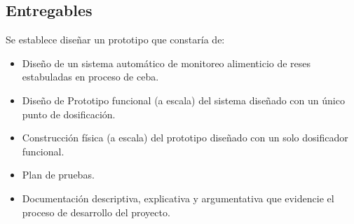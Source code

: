 \subsection{Entregables}
Se establece diseñar un prototipo que constaría de:

\begin{itemize}
	\item Diseño de un sistema automático de monitoreo alimenticio de reses estabuladas en proceso de ceba.  
	\item Diseño de Prototipo funcional (a escala) del sistema diseñado con un único punto de dosificación.
	\item Construcción física (a escala) del prototipo diseñado con un solo dosificador funcional.
	\item Plan de pruebas.
	\item Documentación descriptiva, explicativa y argumentativa que evidencie el proceso de desarrollo del proyecto.
\end{itemize}


